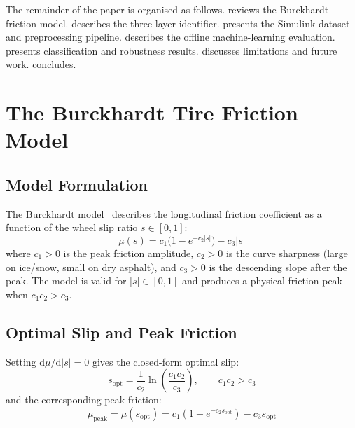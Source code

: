 \documentclass[11pt,a4paper]{article}
\newcommand{\mumax}{\mu_{\mathrm{peak}}}
\newcommand{\sopt}{s_{\mathrm{opt}}}
\begin{document}
The remainder of the paper is organised as follows.
 reviews the Burckhardt friction model.
 describes the three-layer identifier.
 presents the Simulink dataset and preprocessing pipeline.
 describes the offline machine-learning evaluation.
 presents classification and robustness results.
 discusses limitations and future work.
 concludes.

\section{The Burckhardt Tire Friction Model}
\label{sec:model}

\subsection{Model Formulation}

The Burckhardt model~\cite{burckhardt1993} describes the longitudinal friction
coefficient as a function of the wheel slip ratio $s \in [0,1]$:
\begin{equation}
  \mu(s) = c_1 \bigl(1 - e^{-c_2 |s|}\bigr) - c_3 |s|
  \label{eq:burckhardt}
\end{equation}
where $c_1 > 0$ is the peak friction amplitude, $c_2 > 0$ is the curve sharpness
(large on ice/snow, small on dry asphalt), and $c_3 > 0$ is the descending slope
after the peak.
The model is valid for $|s| \in [0, 1]$ and produces a physical friction peak
when $c_1 c_2 > c_3$.

\subsection{Optimal Slip and Peak Friction}

Setting $\mathrm{d}\mu / \mathrm{d}|s| = 0$ gives the closed-form optimal slip:
\begin{equation}
  \sopt = \frac{1}{c_2} \ln\!\left(\frac{c_1 c_2}{c_3}\right), \qquad
  c_1 c_2 > c_3
  \label{eq:sopt}
\end{equation}
and the corresponding peak friction:
\begin{equation}
  \mumax = \mu(\sopt) = c_1\!\left(1 - e^{-c_2 \sopt}\right) - c_3 \sopt
  \label{eq:mupeak}
\end{equation}
\end{document}
